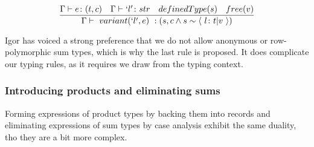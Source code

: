 \documentclass[11pt]{article}
\begin{document}
\begin{enumerate}
$$
\frac
{
\Gamma \vdash e \colon (t, c) \quad
\Gamma \vdash `l' \colon str \quad
definedType(s) \quad
free(v)
}
{
\Gamma \vdash \ variant(`l', e) \ :
(s, c \land s \sim \langle \ l \colon t | v \ \rangle)
}
$$


Igor has voiced a strong preference that we do not allow anonymous or
row-polymorphic sum types, which is why the last rule is proposed. It does
complicate our typing rules, as it requires we draw from the typing context.
\end{enumerate}


\subsubsection{Introducing products and eliminating sums}
\label{sec:org6a0635d}
Forming expressions of product types by backing them into records and
eliminating expressions of sum types by case analysis exhibit the same
duality, tho they are a bit more complex.
\end{document}
